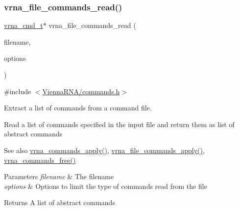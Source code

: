 \subsubsection{\texorpdfstring{vrna\+\_\+file\+\_\+commands\+\_\+read()}{vrna\_file\_commands\_read()}}
{\footnotesize\ttfamily \mbox{\hyperlink{group__file__utils_ga92cb3b5952352b103bcb32e5a99e0e5a}{vrna\+\_\+cmd\+\_\+t}}$\ast$ vrna\+\_\+file\+\_\+commands\+\_\+read (\begin{DoxyParamCaption}\item[{const char $\ast$}]{filename,  }\item[{unsigned int}]{options }\end{DoxyParamCaption})}



{\ttfamily \#include $<$\mbox{\hyperlink{commands_8h}{Vienna\+R\+N\+A/commands.\+h}}$>$}



Extract a list of commands from a command file. 

Read a list of commands specified in the input file and return them as list of abstract commands

\begin{DoxySeeAlso}{See also}
\mbox{\hyperlink{group__file__utils_ga5e993fc4b9602af73aaaab4d3b3cd9a9}{vrna\+\_\+commands\+\_\+apply()}}, \mbox{\hyperlink{group__file__utils_gadbe8c9622f7bcc6dcbe3448b98df8656}{vrna\+\_\+file\+\_\+commands\+\_\+apply()}}, \mbox{\hyperlink{group__file__utils_ga926fd7632e68f3da2e2069402b80b1ab}{vrna\+\_\+commands\+\_\+free()}}
\end{DoxySeeAlso}

\begin{DoxyParams}{Parameters}
{\em filename} & The filename \\
\hline
{\em options} & Options to limit the type of commands read from the file \\
\hline
\end{DoxyParams}
\begin{DoxyReturn}{Returns}
A list of abstract commands 
\end{DoxyReturn}
\mbox{\label{group__file__utils_gadbe8c9622f7bcc6dcbe3448b98df8656}} 

